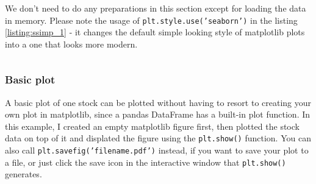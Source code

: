 \documentclass[12pt, a4paper]{article}
\begin{document}

We don't need to do any preparations in this section except for loading the data in memory. Please note the usage of \texttt{plt.style.use('seaborn')} in the listing \ref{listing:ssimp_1} - it changes the default simple looking style of matplotlib plots into a one that looks more modern.

\bgroup
  \inputminted[linenos, breaklines=true, fontsize=\scriptsize, firstnumber=last]{python}{src/stocks/simple/1_get_data.py}
  \label{listing:ssimp_1}
\egroup

\subsubsection{Basic plot}

A basic plot of one stock can be plotted without having to resort to creating your own plot in matplotlib, since a pandas DataFrame has a built-in plot function. In this example, I created an empty matplotlib figure first, then plotted the stock data on top of it and displated the figure using the \texttt{plt.show()} function. You can also call \texttt{plt.savefig('filename.pdf')} instead, if you want to save your plot to a file, or just click the save icon in the interactive window that \texttt{plt.show()} generates.

\bgroup
  \inputminted[linenos, breaklines=true, fontsize=\scriptsize, firstnumber=last]{python}{src/stocks/simple/2_onestock.py}
  \label{listing:ssimp_2}
\egroup
\end{document}
